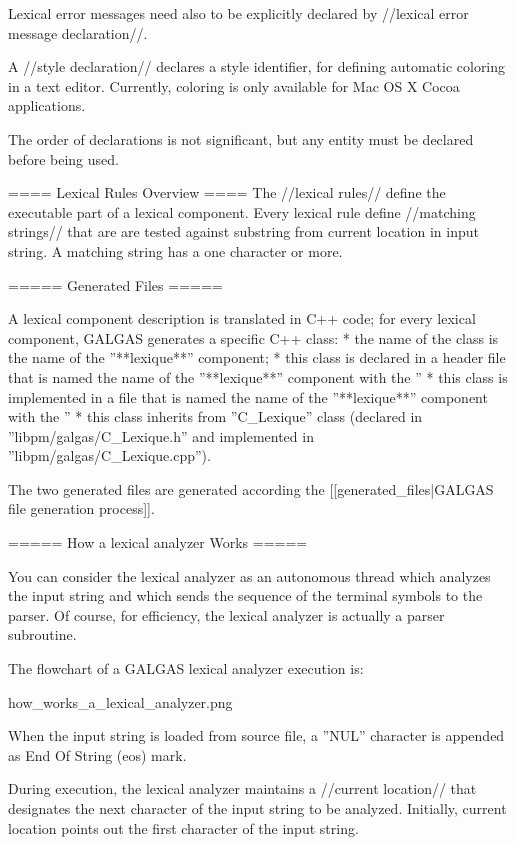 Lexical error messages need also to be explicitly declared by //lexical error message declaration//. 

A //style declaration// declares a style identifier, for defining automatic coloring in a text editor. Currently, coloring is only available for Mac OS X Cocoa applications.

The order of declarations is not significant, but any entity must be declared before being used.

==== Lexical Rules Overview ====
The //lexical rules// define the executable part of a lexical component. Every lexical rule define //matching strings// that are are tested against substring from current location in input string. A matching string has a one character or more.

===== Generated Files =====

A lexical component description is translated in C++ code; for every lexical component, GALGAS generates a specific C++ class:
  * the name of the class is the name of the ''**lexique**'' component;
  * this class is declared in a header file that is named the name of the ''**lexique**'' component with the ''%
  * this class is implemented in a file that is named the name of the ''**lexique**'' component with the ''%
  * this class inherits from ''C\_Lexique'' class (declared in ''libpm/galgas/C\_Lexique.h'' and implemented in ''libpm/galgas/C\_Lexique.cpp'').

The two generated files are generated according the [[generated\_files|GALGAS file generation process]].


===== How a lexical analyzer Works =====

You can consider the lexical analyzer as an autonomous thread which analyzes the input string and which sends the sequence of the terminal symbols to the parser. Of course, for efficiency, the lexical analyzer is actually a parser subroutine.

The flowchart of a GALGAS lexical analyzer execution is:

{{ how\_works\_a\_lexical\_analyzer.png }}

When the input string is loaded from source file, a ''NUL'' character is appended as End Of String (eos) mark.

During execution, the lexical analyzer maintains a //current location// that designates the next character of the input string to be analyzed. Initially, current location points out the first character of the input string.

